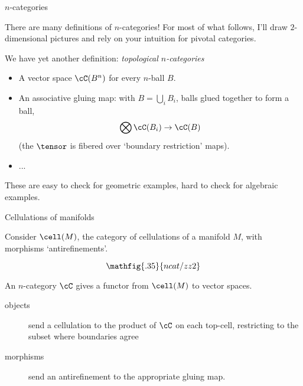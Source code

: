 \documentclass[beamer, compress]{beamer}
\begin{document}
\begin{frame}{$n$-categories}
\begin{block}{There are many definitions of $n$-categories!}
For most of what follows, I'll draw $2$-dimensional pictures and rely on your intuition for pivotal categories. 
\end{block}
\begin{block}{We have yet another definition: \emph{topological $n$-categories}}
\begin{itemize}
\item A vector space $\cC(B^n)$ for every $n$-ball $B$.
\item An associative gluing map: with $B = \bigcup_i B_i$, balls glued together to form a ball,
$$\bigotimes \cC(B_i) \to \cC(B)$$
(the $\tensor$ is fibered over `boundary restriction' maps).
\item ...
\end{itemize}
\end{block}
These are easy to check for geometric examples, hard to check for algebraic examples.
\end{frame}

\begin{frame}{Cellulations of manifolds}
\begin{block}{}
Consider $\cell(M)$, the category of cellulations of a manifold $M$, with morphisms `antirefinements'.
\end{block}
\vspace{-4mm}
$$\mathfig{.35}{ncat/zz2}$$
\vspace{-4mm}
\begin{block}{}
An $n$-category $\cC$ gives a functor from $\cell(M)$ to vector spaces.
\begin{description}
\item[objects] send a cellulation to the product of $\cC$ on each top-cell, restricting to the subset where boundaries agree
\item[morphisms] send an antirefinement to the appropriate gluing map.
\end{description}
\end{block}
\end{frame}
\end{document}
